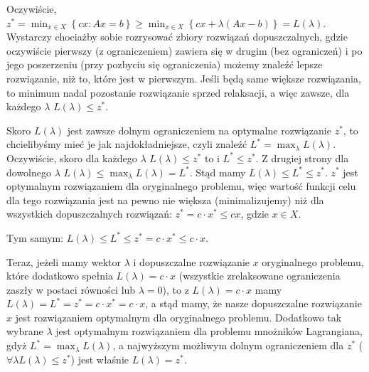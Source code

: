 Oczywiście, $z^{\ast} = \min_{x \in X} \left\{ cx : Ax = b \right\} \geqslant \min_{x \in X} \left\{ cx + \lambda \left( Ax - b \right)  \right\} = L \left( \lambda \right)$. Wystarczy chociażby sobie rozrysować zbiory rozwiązań dopuszczalnych, gdzie oczywiście pierwszy (z ograniczeniem) zawiera się w drugim (bez ograniczeń) i po jego poszerzeniu (przy pozbyciu się ograniczenia) możemy znaleźć lepsze rozwiązanie, niż to, które jest w pierwszym. Jeśli będą same większe rozwiązania, to minimum nadal pozostanie rozwiązanie sprzed relaksacji, a więc zawsze, dla każdego $\lambda$ $L \left( \lambda \right) \leqslant z^{\ast}$.

Skoro $L \left( \lambda \right)$ jest zawsze dolnym ograniczeniem na optymalne rozwiązanie $z^{\ast}$, to chcielibyśmy mieć je jak najdokładniejsze, czyli znaleźć $L^{\ast} = \max_{\lambda} L \left( \lambda \right)$. Oczywiście, skoro dla każdego $\lambda$ $L \left( \lambda \right) \leqslant z^{\ast}$ to  i $L^{\ast} \leqslant z^{\ast}$. Z drugiej strony dla dowolnego $\lambda$ $L \left( \lambda \right) \leqslant \max_{\lambda} L \left( \lambda \right) = L^{\ast}$. Stąd mamy $L \left( \lambda \right) \leqslant L^{\ast} \leqslant z^{\ast}$. $z^{\ast}$ jest optymalnym rozwiązaniem dla oryginalnego problemu, więc wartość funkcji celu dla tego rozwiązania jest na pewno nie większa (minimalizujemy) niż dla wszystkich dopuszczalnych rozwiązań: $z^{\ast} = c \cdot x^{\ast} \leqslant cx$, gdzie $x \in X$.

Tym samym: $L \left( \lambda \right) \leqslant L^{\ast} \leqslant z^{\ast} = c \cdot x^{\ast} \leqslant c \cdot x$.

Teraz, jeżeli mamy wektor $\lambda$ i dopuszczalne rozwiązanie $x$ oryginalnego problemu, które dodatkowo spełnia $L \left( \lambda \right) = c \cdot x$ (wszystkie zrelaksowane ograniczenia zaszły w postaci równości lub $\lambda = 0$), to z $L \left( \lambda \right) = c \cdot x$ mamy $L \left( \lambda \right) = L^{\ast} = z^{\ast} = c \cdot x^{\ast} = c \cdot x$, a stąd mamy, że nasze dopuszczalne rozwiązanie $x$ jest rozwiązaniem optymalnym dla oryginalnego problemu. Dodatkowo tak wybrane $\lambda$ jest optymalnym rozwiązaniem dla problemu mnożników Lagrangiana, gdyż $L^{\ast} = \max_{\lambda} L \left( \lambda \right)$, a najwyższym możliwym dolnym ograniczeniem dla $z^{\ast}$ ($\forall \lambda L \left( \lambda \right) \leqslant z^{\ast}$) jest właśnie $L \left( \lambda \right) = z^{\ast}$.

